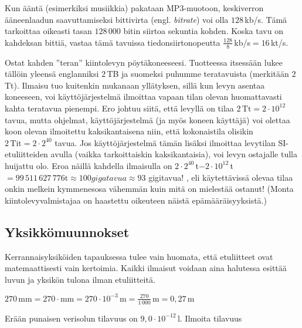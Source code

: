 \begin{esimerkki}
Kun ääntä (esimerkiksi musiikkia) pakataan MP3-muotoon, keskiverron ääneenlaadun saavuttamiseksi bittivirta (engl. \textit{bitrate}) voi olla $128$\,kb/s. Tämä tarkoittaa oikeasti tasan $128\,000$ bitin siirtoa sekuntia kohden. Koska tavu on kahdeksan bittiä, vastaa tämä tavuissa tiedonsiirtonopeutta $\frac{128}{8}$\,kb/s$=16$\,kt/s.
\end{esimerkki}

\begin{esimerkki}
Ostat kahden ''teran'' kiintolevyn pöytäkoneeseesi. Tuotteessa itsessään lukee tällöin yleensä englanniksi $2$\,TB ja suomeksi puhumme teratavuista (merkitään $2$\,Tt). Ilmaisu tuo kuitenkin mukanaan yllätyksen, sillä kun levyn asentaa koneeseen, voi käyttöjärjestelmä ilmoittaa vapaan tilan olevan huomattavasti kahta teratavua pienempi. Ero johtuu siitä, että levyllä on tilaa $2\,\textrm{Tt}=2\cdot 10^{12}$ tavua, mutta ohjelmat, käyttöjärjestelmä (ja myös koneen käyttäjä) voi olettaa koon olevan ilmoitettu kaksikantaisena niin, että kokonaistila olisikin $2\,\textrm{Tit}=2\cdot 2^{40}$ tavua. Jos käyttöjärjestelmä tämän lisäksi ilmoittaa levytilan SI-etuliitteiden avulla (vaikka tarkoittaiskin kaksikantaisia), voi levyn ostajalle tulla huijattu olo. Eroa näillä kahdella ilmaisulla on $2\cdot 2^{40}\,$t$-2\cdot 10^{12}\,$t$=99\,511\,627\,776\textrm{t}\approx 100 gigatavua \approx 93$ gigitavua! , eli käytettävissä olevaa tilaa onkin melkein kymmenesosa vähemmän kuin mitä on mielestää ostanut! (Monta kiintolevyvalmistajaa on haastettu oikeuteen näistä epämääräisyyksistä.)
\end{esimerkki}

\subsection*{Yksikkömuunnokset}

Kerrannaisyksiköiden tapauksessa tulee vain huomata, että etuliitteet ovat matemaattisesti vain kertoimia. Kaikki ilmaisut voidaan aina halutessa esittää luvun ja yksikön tulona ilman etuliitteitä.

\begin{esimerkki}
$270\,\text{mm}=270\cdot\text{mm}=270\cdot10^{-3}\,\text{m}=\frac{270}{1\,000}\,\text{m}=0,27\,\text{m}$
\end{esimerkki}

\begin{esimerkki}
Erään punaisen verisolun tilavuus on $9,0 \cdot 10^{-12}$\,l. Ilmoita tilavuus

\begin{esimratk}
\end{esimratk}
\end{esimerkki}

